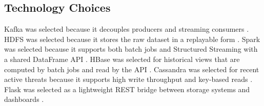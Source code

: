 \subsection{Technology Choices}

Kafka was selected because it decouples producers and streaming consumers \cite{kafka_docs}. HDFS was selected because it stores the raw dataset in a replayable form \cite{hdfs_docs}. Spark was selected because it supports both batch jobs and Structured Streaming with a shared DataFrame API \cite{spark_docs,spark_streaming_docs}. HBase was selected for historical views that are computed by batch jobs and read by the API \cite{hbase_docs}. Cassandra was selected for recent active threats because it supports high write throughput and key-based reads \cite{cassandra_docs}. Flask was selected as a lightweight REST bridge between storage systems and dashboards \cite{flask_docs}.
